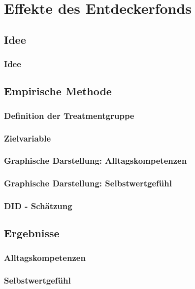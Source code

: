\section{Effekte des Entdeckerfonds}

\subsection{Idee}

\begin{frame}[fragile]
\frametitle{Idee}
\end{frame}

\subsection{Empirische Methode}

\begin{frame}[fragile]
\frametitle{Definition der Treatmentgruppe}
\end{frame}

\begin{frame}[fragile]
\frametitle{Zielvariable}
\end{frame}

\begin{frame}[fragile]
\frametitle{Graphische Darstellung: Alltagskompetenzen}
\end{frame}

\begin{frame}[fragile]
\frametitle{Graphische Darstellung: Selbstwertgefühl}
\end{frame}

\begin{frame}[fragile]
\frametitle{DID - Schätzung}
\end{frame}

\subsection{Ergebnisse}

\begin{frame}[fragile]
\frametitle{Alltagskompetenzen}
\end{frame}

\begin{frame}[fragile]
\frametitle{Selbstwertgefühl}
\end{frame}

	



